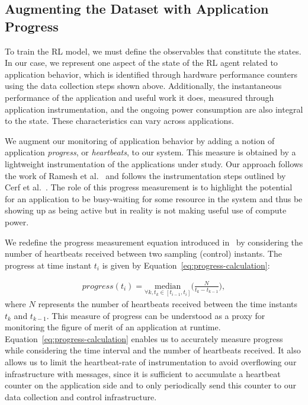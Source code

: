 \subsection{Augmenting the Dataset with Application Progress} \label{subsec:Performance_Measurement}
To train the RL model, we must define the observables that constitute the states. In our case, we represent one aspect of the state of the RL agent related to application behavior, which is identified through hardware performance counters using the data collection steps shown above. Additionally, the instantaneous performance of the application and useful work it does, measured through application instrumentation, and the ongoing power consumption are also integral to the state. These characteristics can vary across applications.

We augment our monitoring of application behavior by adding a notion of application \textit{progress}, or \textit{heartbeats}, to our system. This measure is obtained by a lightweight instrumentation of the applications under study.  Our approach follows the work of Ramesh et al.~\cite{ramesh2019understanding} and follows the instrumentation steps outlined by Cerf et al.~\cite{cerf2021sustaining}.
The role of this progress measurement is to highlight the potential for an application to be busy-waiting for some resource in the system and thus be showing up as being active but in reality is not making useful use of compute power.

We redefine the progress measurement equation introduced in~\cite{ramesh2019understanding} by considering the number of heartbeats received between two sampling (control) instants. The progress at time instant $t_i$ is given by Equation~\eqref{eq:progress-calculation}:

\begin{equation}
\begin{aligned}
progress(t_i) = \underset{\forall k,t_k \in [t_{i-1},t_i]}{\text{median}}\bigg(\frac{N}{t_k-t_{k-1}} \bigg),
\end{aligned}
\label{eq:progress-calculation}
\end{equation}
where $N$ represents the number of heartbeats received between the time instants
$t_k$ and $t_{k-1}$. This measure of
progress can be understood as a proxy for monitoring the figure of merit
of an application at runtime. Equation~\eqref{eq:progress-calculation} enables us to accurately measure progress while considering the time interval and the number of heartbeats received. It also allows us to limit the heartbeat-rate of instrumentation to avoid overflowing our infrastructure with messages, since  it is sufficient to accumulate a 
heartbeat counter on the application side and to only periodically send this
counter to our data collection and control infrastructure. 

